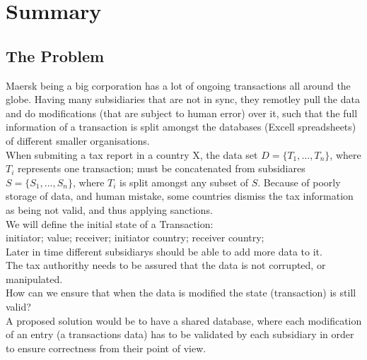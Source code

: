\section{Summary}
\subsection{The Problem}
Maersk being a big corporation has a lot of ongoing transactions all around the globe. Having many subsidiaries that are not in sync, they remotley pull the data and do modifications (that are subject to human error) over it, such that the full information of a transaction is split amongst the databases (Excell spreadsheets) of different smaller organisations. 
\\
When submiting a tax report in a country X, the data set $D=\{T_1,...,T_n\}$, where $T_i$ represents one transaction; must be concatenated from subsidiares $S=\{S_1,...,S_n\}$, where $T_i$ is split amongst any subset of $S$. Because of poorly storage of data, and human mistake, some countries dismiss the tax information as being not valid, and thus applying sanctions.\\
We will define the initial state of a Transaction:\\
initiator; value; receiver; initiator country; receiver country;\\
Later in time different subsidiarys should be able to add more data to it.
\\
The tax authorithy needs to be assured that the data is not corrupted, or manipulated. 
\\
How can we ensure that when the data is modified the state (transaction) is still valid?\\
A proposed solution would be to have a shared database, where each modification of an entry (a transactions data) has to be validated by each subsidiary in order to ensure correctness from their point of view.
